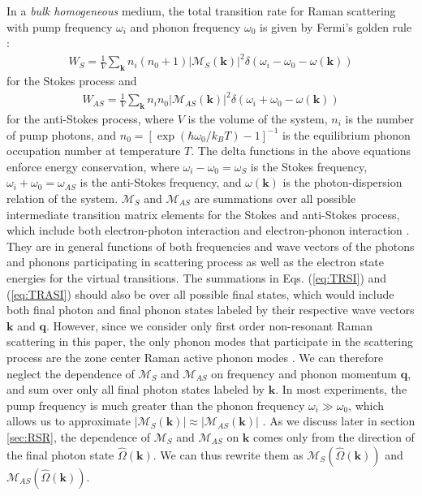 \documentclass[%
 reprint,
superscriptaddress,
 amsmath,amssymb,
 aps,
pra,
]{revtex4-1}
\newcommand{\mb}[1]{\mathbf{#1}} %
\begin{document}
In a \textit{bulk homogeneous} medium, the total transition rate for Raman scattering with pump frequency $\omega_i$ and phonon frequency $\omega_0$ is given by Fermi's golden rule \cite{loudon1963theory,loudon1964raman}:
\begin{align}\label{eq:TRSI}
W_{S}= \frac{1}{V}\sum_{\mb{k}} n_i (n_0+1)|\mathcal{M}_{S}(\mb{k})|^2 \delta(\omega_i-\omega_0-\omega(\mb{k}))
\end{align}
for the Stokes process and
\begin{align}\label{eq:TRASI}
W_{AS}= \frac{1}{V}\sum_{\mb{k}} n_i n_0 |\mathcal{M}_{AS}(\mb{k})|^2 \delta(\omega_i+\omega_0-\omega(\mb{k}))
\end{align}
for the anti-Stokes process, where $V$ is the volume of the system, $n_i$ is the number of pump photons, and $n_0=[\exp(\hbar\omega_0/k_BT)-1]^{-1}$ is the equilibrium phonon occupation number at temperature $T$. The delta functions in the above equations enforce energy conservation, where $\omega_i-\omega_0=\omega_{S}$ is the Stokes frequency, $\omega_i+\omega_0=\omega_{AS}$ is the anti-Stokes frequency, and $\omega(\mb{k})$ is the photon-dispersion relation of the system. $\mathcal{M}_{S}$ and $\mathcal{M}_{AS}$ are summations over all possible intermediate transition matrix elements for the Stokes and anti-Stokes process, which include both electron-photon interaction and electron-phonon interaction \cite{loudon1963theory}. They are in general functions of both frequencies and wave vectors of the photons and phonons participating in scattering process as well as the electron state energies for the virtual transitions. The summations in Eqs. (\ref{eq:TRSI}) and (\ref{eq:TRASI}) should also be over all possible final states, which would include both final photon and final phonon states labeled by their respective wave vectors $\mb{k}$ and $\mb{q}$. 
However, since we consider only first order non-resonant Raman scattering in this paper, the only phonon modes that participate in the scattering process are the zone center Raman active phonon modes \cite{yu1996fundamentals}. We can therefore neglect the dependence of $\mathcal{M}_{S}$ and $\mathcal{M}_{AS}$ on frequency and phonon momentum $\mb{q}$, and sum over only all final photon states labeled by $\mb{k}$. In most experiments, the pump frequency is much greater than the phonon frequency $\omega_i\gg\omega_0$, which allows us to approximate $|\mathcal{M}_{S}(\mb{k})|\approx |\mathcal{M}_{AS}(\mb{k})|$ \cite{yu1996fundamentals}.
As we discuss later in section \ref{sec:RSR}, the dependence of $\mathcal{M}_{S}$ and $\mathcal{M}_{AS}$ on $\mb{k}$ comes only from the direction of the final photon state $\hat{\Omega}(\mb{k})$. We can thus rewrite them as $\mathcal{M}_{S}(\hat{\Omega}(\mb{k}))$ and $\mathcal{M}_{AS}(\hat{\Omega}(\mb{k}))$.
\end{document}
